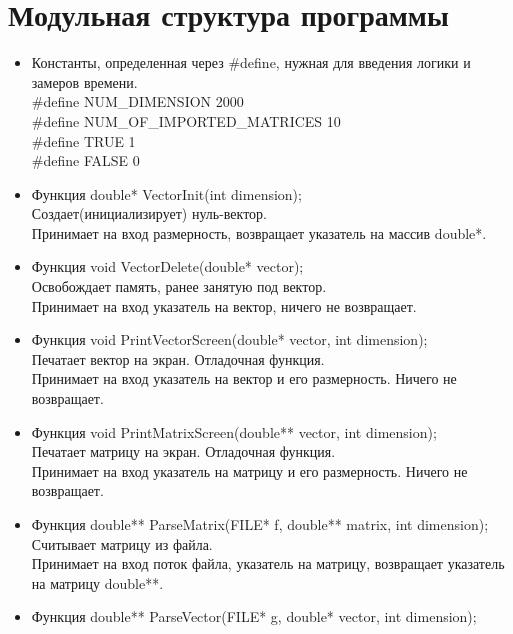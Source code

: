 \documentclass[12pt]{article}
\begin{document}
\section{Модульная структура программы}
\begin{itemize}
\item Константы, определенная через \#define, нужная для введения логики и замеров времени.\\
\#define  NUM\_DIMENSION 2000\\
\#define NUM\_OF\_IMPORTED\_MATRICES 10\\
\#define TRUE 1\\
\#define FALSE 0 \\

\item Функция double* VectorInit(int dimension);\\
Создает(инициализирует) нуль-вектор.\\
Принимает на вход размерность, возвращает указатель на массив double*.\\
\item Функция void VectorDelete(double* vector);\\
Освобождает память, ранее занятую под вектор.\\
Принимает на вход указатель на вектор, ничего не возвращает.\\
\item  Функция void PrintVectorScreen(double* vector, int dimension);\\
Печатает вектор на экран. Отладочная функция.\\
Принимает на вход указатель на вектор и его размерность. Ничего не возвращает.\\
\item  Функция void PrintMatrixScreen(double** vector, int dimension);\\
Печатает матрицу на экран. Отладочная функция.\\
Принимает на вход указатель на матрицу и его размерность. Ничего не возвращает.\\
\item Функция double** ParseMatrix(FILE* f, double** matrix, int dimension);\\
Считывает матрицу из файла.\\
Принимает на вход поток файла, указатель на матрицу, возвращает указатель на матрицу double**.\\
\item Функция double** ParseVector(FILE* g, double* vector, int dimension);\\

\end{itemize}
\end{document}
